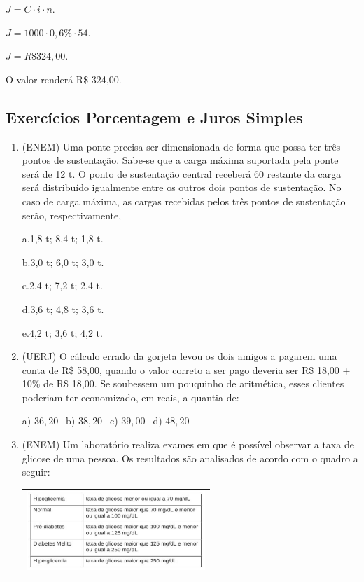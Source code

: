 \begin{multicols*}{2}
\begin{enumerate}
		$ J = C \cdot i \cdot n$.
		
		$ J = 1000 \cdot 0,6\% \cdot 54 $.
		
		$ J = R\$ 324,00 $.
		
		O valor renderá R\$ 324,00.
		
  		\end{enumerate}			

		\subsection{Exercícios Porcentagem e Juros Simples}
		
		\begin{enumerate}
		
		\item (ENEM) Uma ponte precisa ser dimensionada de forma que possa ter três pontos de sustentação. Sabe-se que a carga máxima suportada pela ponte será de 12 t. O ponto de sustentação central receberá 60%
restante da carga será distribuído igualmente entre os outros dois pontos de sustentação. No caso de carga máxima, as cargas recebidas pelos três pontos de sustentação serão, respectivamente,

a.1,8 t; 8,4 t; 1,8 t.

b.3,0 t; 6,0 t; 3,0 t.

c.2,4 t; 7,2 t; 2,4 t.

d.3,6 t; 4,8 t; 3,6 t.

e.4,2 t; 3,6 t; 4,2 t.

		\item (UERJ) O cálculo errado da gorjeta levou os dois amigos a pagarem uma conta de R\$ 58,00, quando o valor correto a ser pago deveria ser R\$ 18,00 + 10\% de R\$ 18,00. Se soubessem um pouquinho de aritmética, esses clientes
poderiam ter economizado, em reais, a quantia de:

		a) $36,20 \ \ $ b) $38,20 \ \ $ c) $39,00 \ \ $ d) $48,20 $

		\item (ENEM) Um laboratório realiza exames em que é possível observar a taxa de glicose de uma pessoa. Os
resultados são analisados de acordo com o quadro a seguir:

        	\begin{tabular}{@{}c@{}}
      		\includegraphics[height=30mm]{assets/glicemia.png}
    		\end{tabular}   	


\end{enumerate}
\end{multicols*}

